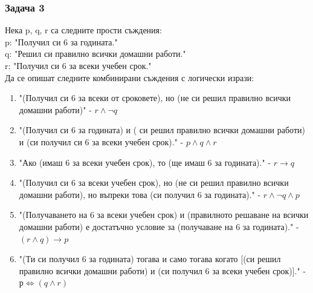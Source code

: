 \documentclass[fleqn, 12pt]{article}
\theoremstyle{definition}
\begin{document}
\subsubsection*{Задача 3}
Нека p, q, r са следните прости съждения:\\
p: "Получил си 6 за годината." \\
q: "Решил си правилно всички домашни работи." \\
r: "Получил си 6 за всеки учебен срок." \\
Да се опишат следните комбинирани съждения с логически изрази:
\begin{enumerate}
\item  "(Получил си 6 за всеки от сроковете), но (не си решил правилно всички домашни работи)" - $r \land \neg q$
\item "(Получил си 6 за годината) и ( си решил правилно всички домашни работи) и (си получил си 6 за всеки учебен срок)." - $p \land q \land r$
\item "Ако (имаш 6 за всеки учебен срок), то (ще имаш 6 за годината)." - $ r \to q$
\item "(Получил си 6 за всеки учебен срок), но (не си решил правилно всички домашни работи), но въпреки това (си получил 6 за годината)." - $r \land  \neg q \land p$
\item "(Получаването на 6 за всеки учебен срок) и (правилното решаване на всички домашни работи) е достатъчно условие за (получаване на 6 за годината)." - $(r \land q) \to p$
\item "(Ти си получил 6 за годината) тогава и само тогава когато [(си решил  правилно всички домашни работи) и (си получил 6 за всеки учебен срок)]." - $р \Leftrightarrow (q \land r)$ 
\end{enumerate}
\end{document}
